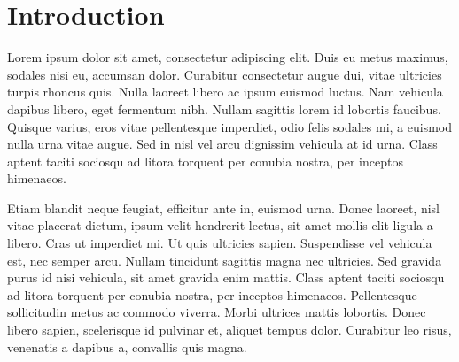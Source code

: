 \chapter{Introduction}

Lorem ipsum dolor sit amet, consectetur adipiscing elit. Duis eu metus maximus, sodales nisi eu, accumsan dolor. Curabitur consectetur augue dui, vitae ultricies turpis rhoncus quis. Nulla laoreet libero ac ipsum euismod luctus. Nam vehicula dapibus libero, eget fermentum nibh. Nullam sagittis lorem id lobortis faucibus. Quisque varius, eros vitae pellentesque imperdiet, odio felis sodales mi, a euismod nulla urna vitae augue. Sed in nisl vel arcu dignissim vehicula at id urna. Class aptent taciti sociosqu ad litora torquent per conubia nostra, per inceptos himenaeos.

Etiam blandit neque feugiat, efficitur ante in, euismod urna. Donec laoreet, nisl vitae placerat dictum, ipsum velit hendrerit lectus, sit amet mollis elit ligula a libero. Cras ut imperdiet mi. Ut quis ultricies sapien. Suspendisse vel vehicula est, nec semper arcu. Nullam tincidunt sagittis magna nec ultricies. Sed gravida purus id nisi vehicula, sit amet gravida enim mattis. Class aptent taciti sociosqu ad litora torquent per conubia nostra, per inceptos himenaeos. Pellentesque sollicitudin metus ac commodo viverra. Morbi ultrices mattis lobortis. Donec libero sapien, scelerisque id pulvinar et, aliquet tempus dolor. Curabitur leo risus, venenatis a dapibus a, convallis quis magna.